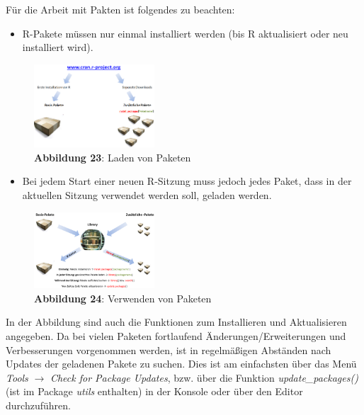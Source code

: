 \documentclass[]{article}
\providecommand{\tightlist}{%
  \setlength{\itemsep}{0pt}\setlength{\parskip}{0pt}}
\begin{document}
Für die Arbeit mit Pakten ist folgendes zu beachten:

\begin{itemize}
\tightlist
\item
  R-Pakete müssen nur einmal installiert werden (bis R aktualisiert oder
  neu installiert wird).
\end{itemize}

\begin{figure}
\centering
\includegraphics[width=0.40000\textwidth]{Images/05_Package_Libraries.PNG}
\caption{\textbf{Abbildung 23}: Laden von Paketen}
\end{figure}

\begin{itemize}
\tightlist
\item
  Bei jedem Start einer neuen R-Sitzung muss jedoch jedes Paket, dass in
  der aktuellen Sitzung verwendet werden soll, geladen werden.
\end{itemize}

\begin{figure}
\centering
\includegraphics[width=0.40000\textwidth]{Images/05_Package_Verwendung.PNG}
\caption{\textbf{Abbildung 24}: Verwenden von Paketen}
\end{figure}

In der Abbildung sind auch die Funktionen zum Installieren und
Aktualisieren angegeben. Da bei vielen Paketen fortlaufend
Änderungen/Erweiterungen und Verbesserungen vorgenommen werden, ist in
regelmäßigen Abständen nach Updates der geladenen Pakete zu suchen. Dies
ist am einfachsten über das Menü \emph{Tools} \(\rightarrow\)
\emph{Check for Package Updates}, bzw. über die Funktion
\emph{update\_packages()} (ist im Package \emph{utils} enthalten) in der
Konsole oder über den Editor durchzuführen.
\end{document}
